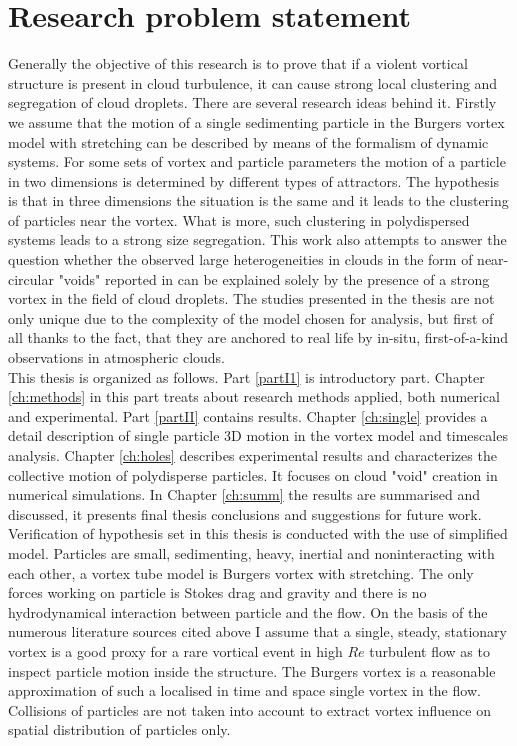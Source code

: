 \documentclass[../main.tex]{subfiles}
\begin{document}
\section{Research problem statement}
Generally the objective of this research is to prove that if a violent vortical structure is present in cloud turbulence, it can cause strong local clustering and segregation of cloud droplets. There are several research ideas behind it. Firstly we assume that the motion of a single sedimenting particle in the Burgers vortex model with stretching can be described by means of the formalism of dynamic systems. For some sets of vortex and particle parameters the motion of a particle in two dimensions is determined by different types of attractors. The hypothesis is that in three dimensions the situation is the same and it leads to the clustering of particles near the vortex. What is more, such clustering in polydispersed systems leads to a strong size segregation. This work also attempts to answer the question whether the observed large heterogeneities in clouds in the form of near-circular "voids" reported in \citet{Xu2012} can be explained solely by the presence of a strong vortex in the field of cloud droplets. The studies presented in the thesis are not only unique due to the complexity of the model chosen for analysis, but first of all thanks to the fact, that they are anchored to real life by in-situ, first-of-a-kind observations in atmospheric clouds.\\
This thesis is organized as follows. Part \ref{partI1} is introductory part. Chapter \ref{ch:methods} in this part treats about research methods applied, both numerical and experimental. Part \ref{partII} contains results. Chapter \ref{ch:single} provides a detail description of single particle 3D motion in the vortex model and timescales analysis. Chapter \ref{ch:holes} describes experimental results and characterizes the collective motion of polydisperse particles. It focuses on cloud "void" creation in numerical simulations. In Chapter \ref{ch:summ} the results are summarised and discussed, it presents final thesis conclusions and suggestions for future work.\\
Verification of hypothesis set in this thesis is conducted with the use of simplified model. Particles are small, sedimenting, heavy, inertial and noninteracting with each other, a vortex tube model is Burgers vortex with stretching. The only forces working on particle is Stokes drag and gravity and there is no hydrodynamical interaction between particle and the flow. On the basis of the numerous literature sources cited above I assume that a single, steady, stationary vortex is a good proxy for a rare vortical event in high $Re$ turbulent flow as to inspect particle motion inside the structure. The Burgers vortex is a reasonable approximation of such a localised in time and space single vortex in the flow. Collisions of particles are not taken into account to extract vortex influence on spatial distribution of particles only.\\
\end{document}
